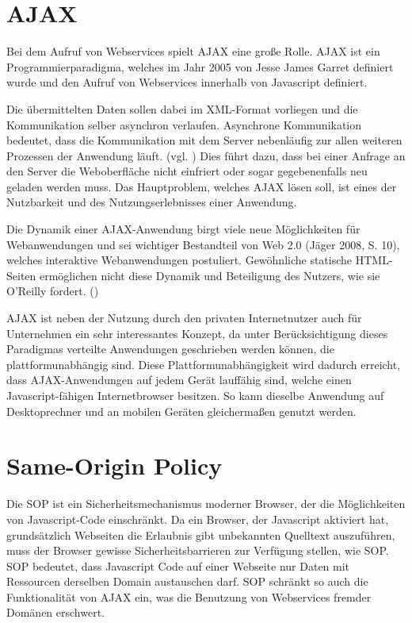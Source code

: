 \section{AJAX}
\label{cha:WS_AJAX}
Bei dem Aufruf von Webservices spielt \ac{AJAX} eine große Rolle. \ac{AJAX} ist ein Programmierparadigma, welches im Jahr 2005 von Jesse James Garret definiert wurde und den Aufruf von Webservices innerhalb von Javascript definiert. \cite[S. 101-102]{Heiderich.2009}

Die übermittelten Daten sollen dabei im \ac{XML}-Format vorliegen und die Kommunikation selber asynchron verlaufen. Asynchrone Kommunikation bedeutet, dass die Kommunikation mit dem Server nebenläufig zur allen weiteren Prozessen der Anwendung läuft. (vgl. \cite[S. 8]{Kitzmann.2008}) Dies führt dazu, dass bei einer Anfrage an den Server die Weboberfläche nicht einfriert oder sogar gegebenenfalls neu geladen werden muss. \cite{Garrett.2005} Das Hauptproblem, welches \ac{AJAX} lösen soll, ist eines der Nutzbarkeit und des Nutzungserlebnisses einer Anwendung. \cite[S.8-9]{Jager.2008} 

Die Dynamik einer \ac{AJAX}-Anwendung birgt viele neue Möglichkeiten für Webanwendungen und sei wichtiger Bestandteil von Web 2.0 (Jäger 2008, S. 10), welches interaktive Webanwendungen postuliert. \cite{OReilly.2005} Gewöhnliche statische \ac{HTML}-Seiten ermöglichen nicht diese Dynamik und Beteiligung des Nutzers, wie sie O’Reilly fordert. (\citeyear{OReilly.2005})

\ac{AJAX} ist neben der Nutzung durch den privaten Internetnutzer auch für Unternehmen ein sehr interessantes Konzept, da unter Berücksichtigung dieses Paradigmas verteilte Anwendungen geschrieben werden können, die plattformunabhängig sind. Diese Plattformunabhängigkeit wird dadurch erreicht, dass \ac{AJAX}-Anwendungen auf jedem Gerät lauffähig sind, welche einen Javascript-fähigen Internetbrowser besitzen. So kann dieselbe Anwendung auf Desktoprechner und an mobilen Geräten gleichermaßen genutzt werden. \cite[S. 11]{Jager.2008}

\section{Same-Origin Policy}

Die \ac{SOP} ist ein Sicherheitsmechanismus moderner Browser, der die Möglichkeiten von Javascript-Code einschränkt. Da ein Browser, der Javascript aktiviert hat, grundsätzlich Webseiten die Erlaubnis gibt unbekannten Quelltext auszuführen, muss der Browser gewisse Sicherheitsbarrieren zur Verfügung stellen, wie \ac{SOP}. \cite[S. 106-109]{Heiderich.2009} \ac{SOP} bedeutet, dass Javascript Code auf einer Webseite nur Daten mit Ressourcen derselben Domain austauschen darf. \ac{SOP} schränkt so auch die Funktionalität von \ac{AJAX} ein, was die Benutzung von Webservices fremder Domänen erschwert.  \cite[S.268]{Jager.2008}

